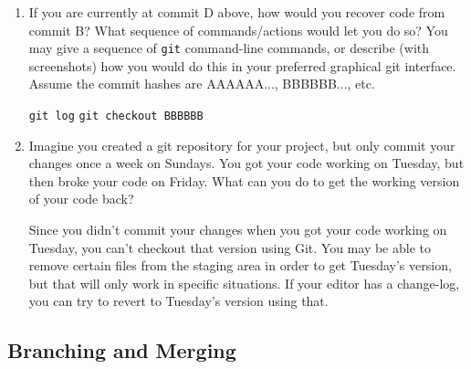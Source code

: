 \documentclass[10pt,twocolumn]{article}
\begin{document}
\begin{enumerate}
\item If you are currently at commit D above, how would you recover code from commit B? What sequence of commands/actions would let you do so? You may give a sequence of \texttt{git} command-line commands, or describe (with screenshots) how you would do this in your preferred graphical git interface. Assume the commit hashes are AAAAAA..., BBBBBB..., etc.\newline
\par 
\texttt{git log}
\newline
\texttt{git checkout BBBBBB}
\newline
\item Imagine you created a git repository for your project, but only commit your changes once a week on Sundays. You got your code working on Tuesday, but then broke your code on Friday. What can you do to get the working version of your code back?\newline
\par Since you didn't commit your changes when you got your code working on Tuesday, you can't checkout that version using Git. You may be able to remove certain files from the staging area in order to get Tuesday's version, but that will only work in specific situations. If your editor has a change-log, you can try to revert to Tuesday's version using that. \newline
\end{enumerate}

\subsection{Branching and Merging}
\end{document}
